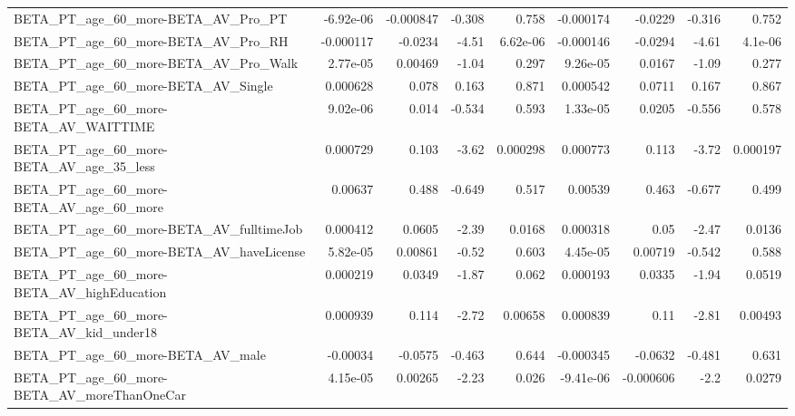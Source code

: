 \begin{tabular}{lrrrrrrrr}
BETA\_PT\_age\_60\_more-BETA\_AV\_Pro\_PT                 &   -6.92e-06 &    -0.000847 &    -0.308 &    0.758 &  -0.000174 &     -0.0229 &       -0.316 &         0.752 \\
BETA\_PT\_age\_60\_more-BETA\_AV\_Pro\_RH                 &   -0.000117 &      -0.0234 &     -4.51 & 6.62e-06 &  -0.000146 &     -0.0294 &        -4.61 &       4.1e-06 \\
BETA\_PT\_age\_60\_more-BETA\_AV\_Pro\_Walk               &    2.77e-05 &      0.00469 &     -1.04 &    0.297 &   9.26e-05 &      0.0167 &        -1.09 &         0.277 \\
BETA\_PT\_age\_60\_more-BETA\_AV\_Single                 &    0.000628 &        0.078 &     0.163 &    0.871 &   0.000542 &      0.0711 &        0.167 &         0.867 \\
BETA\_PT\_age\_60\_more-BETA\_AV\_WAITTIME               &    9.02e-06 &        0.014 &    -0.534 &    0.593 &   1.33e-05 &      0.0205 &       -0.556 &         0.578 \\
BETA\_PT\_age\_60\_more-BETA\_AV\_age\_35\_less            &    0.000729 &        0.103 &     -3.62 & 0.000298 &   0.000773 &       0.113 &        -3.72 &      0.000197 \\
BETA\_PT\_age\_60\_more-BETA\_AV\_age\_60\_more            &     0.00637 &        0.488 &    -0.649 &    0.517 &    0.00539 &       0.463 &       -0.677 &         0.499 \\
BETA\_PT\_age\_60\_more-BETA\_AV\_fulltimeJob            &    0.000412 &       0.0605 &     -2.39 &   0.0168 &   0.000318 &        0.05 &        -2.47 &        0.0136 \\
BETA\_PT\_age\_60\_more-BETA\_AV\_haveLicense            &    5.82e-05 &      0.00861 &     -0.52 &    0.603 &   4.45e-05 &     0.00719 &       -0.542 &         0.588 \\
BETA\_PT\_age\_60\_more-BETA\_AV\_highEducation          &    0.000219 &       0.0349 &     -1.87 &    0.062 &   0.000193 &      0.0335 &        -1.94 &        0.0519 \\
BETA\_PT\_age\_60\_more-BETA\_AV\_kid\_under18            &    0.000939 &        0.114 &     -2.72 &  0.00658 &   0.000839 &        0.11 &        -2.81 &       0.00493 \\
BETA\_PT\_age\_60\_more-BETA\_AV\_male                   &    -0.00034 &      -0.0575 &    -0.463 &    0.644 &  -0.000345 &     -0.0632 &       -0.481 &         0.631 \\
BETA\_PT\_age\_60\_more-BETA\_AV\_moreThanOneCar         &    4.15e-05 &      0.00265 &     -2.23 &    0.026 &  -9.41e-06 &   -0.000606 &         -2.2 &        0.0279 \\

\end{tabular}
